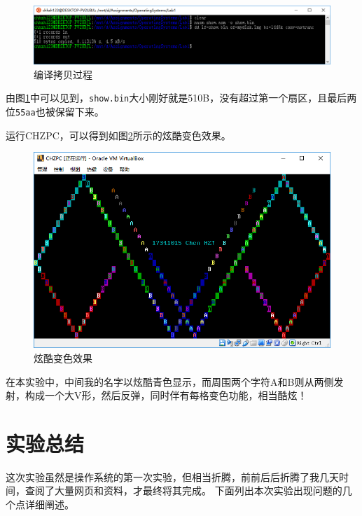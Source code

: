 \documentclass[logo,reportComp]{thesis}
\begin{document}
\begin{figure}[H]
\centering
\includegraphics[width=0.8\linewidth]{fig/nasm.PNG}
\caption{编译拷贝过程}
\label{fig:nasm}
\end{figure}
由图\ref{fig:nasm}中可以见到，\verb'show.bin'大小刚好就是510B，没有超过第一个扇区，且最后两位\verb'55aa'也被保留下来。

运行CHZPC，可以得到如图\ref{fig:result}所示的炫酷变色效果。
\begin{figure}[H]
\centering
\includegraphics[width=0.8\linewidth]{fig/result.PNG}
\caption{炫酷变色效果}
\label{fig:result}
\end{figure}
在本实验中，中间我的名字以炫酷青色显示，而周围两个字符A和B则从两侧发射，构成一个大V形，然后反弹，同时伴有每格变色功能，相当酷炫！


\section{实验总结}
这次实验虽然是操作系统的第一次实验，但相当折腾，前前后后折腾了我几天时间，查阅了大量网页和资料，才最终将其完成。
下面列出本次实验出现问题的几个点详细阐述。
\end{document}

